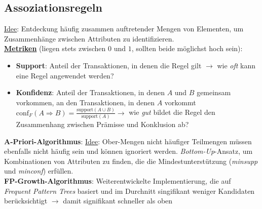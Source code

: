 \subsection{Assoziationsregeln}
\label{assoziationsregeln}

\underline{Idee}: Entdeckung häufig zusammen auftretender Mengen von Elementen, um Zusammenhänge zwischen Attributen zu identifizieren.\\

\textbf{\underline{Metriken}} (liegen stets zwischen $0$ und $1$, sollten beide möglichst hoch sein):

\begin{itemize}
    \item \textbf{Support}: Anteil der Transaktionen, in denen die Regel gilt $\rightarrow$ wie \emph{oft} kann eine Regel angewendet werden?
    \item \textbf{Konfidenz}: Anteil der Transaktionen, in denen $A$ und $B$ gemeinsam vorkommen, an den Transaktionen, in denen $A$ vorkommt $\text{conf}_F(A\Rightarrow B)=\frac{\text{support}(A\cup B)}{\text{support}(A)} \rightarrow$ wie \emph{gut} bildet die Regel den Zusammenhang zwischen Prämisse und Konklusion ab?
\end{itemize}


\textbf{A-Priori-Algorithmus}: \underline{Idee}: Ober-Mengen nicht häufiger Teilmengen müssen ebenfalls nicht häufig sein und können ignoriert werden. \emph{Bottom-Up}-Ansatz, um Kombinationen von Attributen zu finden, die die Mindestunterstützung (\emph{minsupp} und \emph{minconf}) erfüllen.\\

\textbf{FP-Growth-Algorithmus}: Weiterentwickelte Implementierung, die auf \emph{Frequent Pattern Trees} basiert und im Durchnitt singifikant weniger Kandidaten berücksichtigt $\rightarrow$ damit signifikant schneller als oben\\